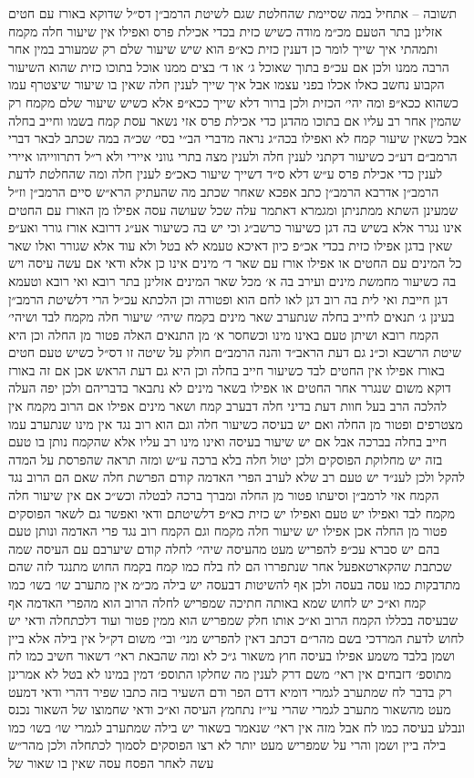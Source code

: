 \documentclass[12pt, openany]{book}
\begin{document}
\begin{multicols}{2}
תשובה – אתחיל במה שסיימת שהחלטת שגם לשיטת הרמב״ן דס״ל שדוקא באורז עם חטים אזלינן בתר הטעם מכ״מ מודה כשיש כזית בכדי אכילת פרס ואפילו אין שיעור חלה מקמח ותמהתי איך שייך לומר כן דענין כזית כא״פ הוא שיש שיעור שלם רק שמעורב במין אחר הרבה ממנו ולכן אם עכ״פ בתוך שאוכל ג׳ או ד׳ בצים ממנו אוכל בתוכו כזית שהוא השיעור הקבוע נחשב כאלו אכלו בפני עצמו אבל איך שייך לענין חלה שאין בו שיעור שיצטרף עמו כשהוא ככא״פ ומה יהי׳ הכזית ולכן ברור דלא שייך ככא״פ אלא כשיש שיעור שלם מקמח רק שהמין אחר רב עליו אם בתוכו מהדגן כדי אכילת פרס אזי נשאר עסת קמח בשמו וחייב בחלה אבל כשאין שיעור קמח לא ואפילו בכה״ג נראה מדברי הב״י בסי׳ שכ״ה במה שכתב לבאר דברי הרמב״ם דע״כ כשיעור דקתני לענין חלה ולענין מצה בתרי גווני איירי ולא ר״ל דתרווייהו איירי לענין כדי אכילת פרס ע״ש דלא ס״ד דשייך שיעור כאכ״פ לענין חלה ומה שהחלטת לדעת הרמב״ן אדרבא הרמב״ן כתב אפכא שאחר שכתב מה שהעתיק הרא״ש סיים הרמב״ן וז״ל שמעינן השתא ממתניתן ומגמרא דאתמר עלה שכל שעושה עסה אפילו מן האורז עם החטים אינו נגרר אלא בשיש בה דגן כשיעור כרשב״ג וכי יש בה כשיעור אע״ג דרובא אורז גורר ואע״פ שאין בדגן אפילו כזית בכדי אכ״פ כיון דאיכא טעמא לא בטל ולא עוד אלא שגורר ואלו שאר כל המינים עם החטים או אפילו אורז עם שאר ד׳ מינים אינו כן אלא ודאי אם עשה עיסה ויש בה כשיעור מחמשת מינים ועירב בה א׳ מכל שאר המינים אזלינן בתר רובא ואי רובא וטעמא דגן חייבת ואי לית בה רוב דגן לאו לחם הוא ופטורה וכן הלכתא עכ״ל הרי דלשיטת הרמב״ן בעינן ג׳ תנאים לחייב בחלה שנתערב שאר מינים בקמח שיהי׳ שיעור חלה מקמח לבד ושיהי׳ הקמח רובא ושיתן טעם באינו מינו וכשחסר א׳ מן התנאים האלה פטור מן החלה וכן היא שיטת הרשבא וכ״נ גם דעת הראב״ד והנה הרמב״ם חולק על שיטה זו דס״ל כשיש טעם חטים באורז אפילו אין החטים לבד כשיעור חייב בחלה וכן היא גם דעת הראש אכן אם זה באורז דוקא משום שנגרר אחר החטים או אפילו בשאר מינים לא נתבאר בדבריהם ולכן יפה העלה להלכה הרב בעל חוות דעת בדיני חלה דבערב קמח ושאר מינים אפילו אם הרוב מקמח אין מצטרפים ופטור מן החלה ואם יש בעיסה כשיעור חלה וגם הוא רוב נגד אין מינו שנתערב עמו חייב בחלה בברכה אבל אם יש שיעור בעיסה ואינו מינו רב עליו אלא שהקמח נותן בו טעם בזה יש מחלוקת הפוסקים ולכן יטול חלה בלא ברכה ע״ש ומזה תראה שהפרסת על המדה להקל ולכן לענ״ד יש טעם רב שלא לערב הפרי האדמה קודם הפרשת חלה שאם הם הרוב נגד הקמח אזי לרמב״ן וסיעתו פטור מן החלה ומברך ברכה לבטלה וכש״כ אם אין שיעור חלה מקמח לבד ואפילו יש טעם ואפילו יש כזית כא״פ דלשיטתם ודאי ואפשר גם לשאר הפוסקים פטור מן החלה אכן אפילו יש שיעור חלה מקמח וגם הקמח רוב נגד פרי האדמה ונותן טעם בהם יש סברא עכ״פ להפריש מעט מהעיסה שיהי׳ לחלה קודם שיערבם עם העיסה שמה שכתבת שהקארטאפעל אחר שנתפררו הם לח בלח כמו קמח בקמח החוש מתנגד לזה שהם מתדבקות כמו עסה בעסה ולכן אף להשיטות דבעסה יש בילה מכ״מ אין מתערב שו׳ בשו׳ כמו קמח וא״כ יש לחוש שמא באותה חתיכה שמפריש לחלה הרוב הוא מהפרי האדמה אף שבעיסה בכללו הקמח הרוב וא״כ אותו חלק שמפריש הוא ממין פטור ועוד דלכתחלה ודאי יש לחוש לדעת המרדכי בשם מהר״ם דכתב דאין להפריש מני׳ ובי׳ משום דק״ל אין בילה אלא ביין ושמן בלבד משמע אפילו בעיסה חוץ משאור ג״כ לא ומה שהבאת ראי׳ דשאור חשיב כמו לח מתוספ׳ דזבחים אין ראי׳ משם דרק לענין מה שחלקו התוספ׳ דמין במינו לא בטל לא אמרינן רק בדבר לח שמתערב לגמרי דומיא דדם הפר ודם השעיר בזה כתבו שפיר דהרי ודאי דמעט מעט מהשאור מתערב לגמרי שהרי עי״ז נתחמץ העיסה וא״כ ודאי שחמוצו של השאור נכנס ונבלע בעיסה כמו לח אבל מזה אין ראי׳ שנאמר בשאור יש בילה שמתערב לגמרי שו׳ בשו׳ כמו בילה ביין ושמן והרי על שמפריש מעט יותר לא רצו הפוסקים לסמוך לכתחלה ולכן מהר״ש עשה לאחר הפסח עסה שאין בו שאור של 
\end{multicols}
\end{document}
